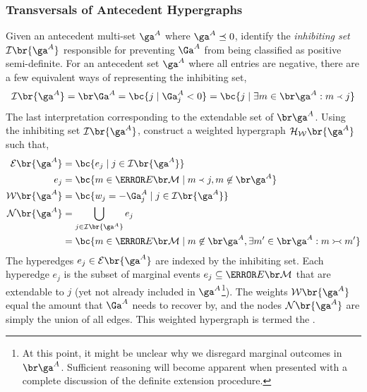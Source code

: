 \documentclass[aps, 10pt, english, twoside, pra, nofootinbib, longbibliography]{revtex4-1}
\begin{document}
    \subsubsection{Transversals of Antecedent Hypergraphs}
    Given an antecedent multi-set $\ga^{A}$ where $\ga^{A} \preceq 0$, identify the \textit{inhibiting set} $\inhibit\br{\ga^{A}}$ responsible for preventing $\Ga^{A}$ from being classified as positive semi-definite. For an antecedent set $\ga^{A}$ where all entries are negative, there are a few equivalent ways of representing the inhibiting set,
    \[ \inhibit\br{\ga^{A}} = \supp{\Ga^{A}} = \bc{j \mid \Ga^A_j < 0} = \bc{j \mid \exists m \in \supp{\ga^A} : m \ext j } \]
    The last interpretation corresponding to the extendable set of $\supp{\ga^{A}}$. Using the inhibiting set $\inhibit\br{\ga^{A}}$, construct a weighted hypergraph $\hgraph_\weights\br{\ga^A}$ such that,
    \begin{align*}
    \edges\br{\ga^{A}} &= \bc{e_j \mid j \in \inhibit\br{\ga^{A}}} \\
    e_j &= \bc{m \in \Events{\mscenario} \mid m \ext j, m \not \in \supp{\ga^A}} \\
    \weights\br{\ga^{A}} &= \bc{w_j = - \Ga^{A}_j \mid j \in \inhibit\br{\ga^{A}}} \\
    \nodes\br{\ga^A} &= \bigcup_{j \in \inhibit\br{\ga^A}} e_j \\
    &= \bc{m \in \Events{\mscenario} \mid m \not \in \supp{\ga^A}, \exists m' \in \supp{\ga^A} : m \com m'}
    \end{align*}
    The hyperedges $e_j \in \edges\br{\ga^{A}}$ are indexed by the inhibiting set. Each hyperedge $e_j$ is the subset of marginal events $e_j \subseteq \Events{\mscenario}$ that are extendable to $j$ (yet not already included in $\ga^A$\footnote{At this point, it might be unclear why we disregard marginal outcomes in $\supp{\ga^A}$. Sufficient reasoning will become apparent when presented with a complete discussion of the definite extension procedure.}). The weights $\weights\br{\ga^A}$ equal the amount that $\Ga^{A}$ needs to recover by, and the nodes $\nodes\br{\ga^A}$ are simply the union of all edges. This weighted hypergraph is termed the .
\end{document}
